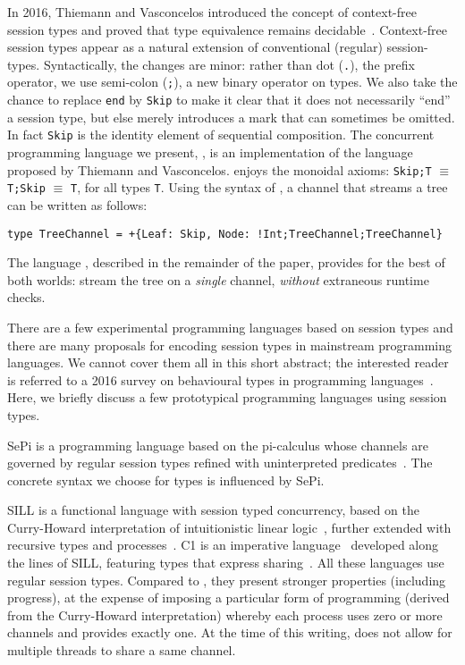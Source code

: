 In 2016, Thiemann and Vasconcelos introduced the concept of
context-free session types and proved that type equivalence remains
decidable~\cite{DBLP:conf/icfp/ThiemannV16}.
%
Context-free session types appear as a natural extension of
conventional (regular) session-types. Syntactically, the changes are
minor: rather than dot (\lstinline|.|), the prefix operator, we use
semi-colon (\lstinline|;|), a new binary operator on types. We also
take the chance to replace \lstinline [morekeywords=end]|end| by
\lstinline|Skip| to make it clear that it does not necessarily ``end''
a session type, but else merely introduces a mark that can sometimes
be omitted. In fact \lstinline|Skip| is the identity element of
sequential composition. The concurrent programming language
we present, \freest, is an implementation of the
language proposed by Thiemann and Vasconcelos.
\freest{} enjoys the monoidal axioms:
\lstinline|Skip;T| $\equiv$ \lstinline|T;Skip| $\equiv$ \lstinline|T|,
for all types \lstinline|T|.
%
Using the syntax of \freest, a channel that streams a tree can be
written as follows:
%
\begin{lstlisting}
type TreeChannel = +{Leaf: Skip, Node: !Int;TreeChannel;TreeChannel}
\end{lstlisting}

The language \freest, described in the remainder of the paper, 
provides for the best
of both worlds: stream the tree on a \emph{single} channel,
\emph{without} extraneous runtime checks.


There are a few experimental programming languages based on session
types and there are many proposals for encoding session types in
mainstream programming languages. We cannot cover them all in
this short abstract; the interested reader is referred to a 2016
survey on behavioural types in programming
languages~\cite{DBLP:journals/ftpl/AnconaBB0CDGGGH16}.  Here, we briefly
discuss a few prototypical programming languages using session types.

SePi is a programming language based on the pi-calculus whose channels
are governed by regular session types refined with uninterpreted
predicates~\cite{DBLP:conf/sefm/FrancoV13}. The concrete syntax we
choose for \freest{} types is influenced by SePi.

SILL is a functional language with session typed concurrency, based on
the Curry-Howard interpretation of intuitionistic linear
logic~\cite{DBLP:conf/concur/CairesP10}, further extended with
recursive types and
processes~\cite{Toninho:phd,DBLP:conf/esop/ToninhoCP13}.
%
C1 is an imperative language~\cite{Pfenning:C1} developed along the
lines of SILL, featuring types that express
sharing~\cite{DBLP:journals/pacmpl/BalzerP17}.
%
All these languages use regular session types. Compared to \freest,
they present stronger properties (including progress), at the expense
of imposing a particular form of programming (derived from the
Curry-Howard interpretation) whereby each process uses zero or more
channels and provides exactly one. At the time of this writing,
\freest{} does not allow for multiple threads to share a same channel.

